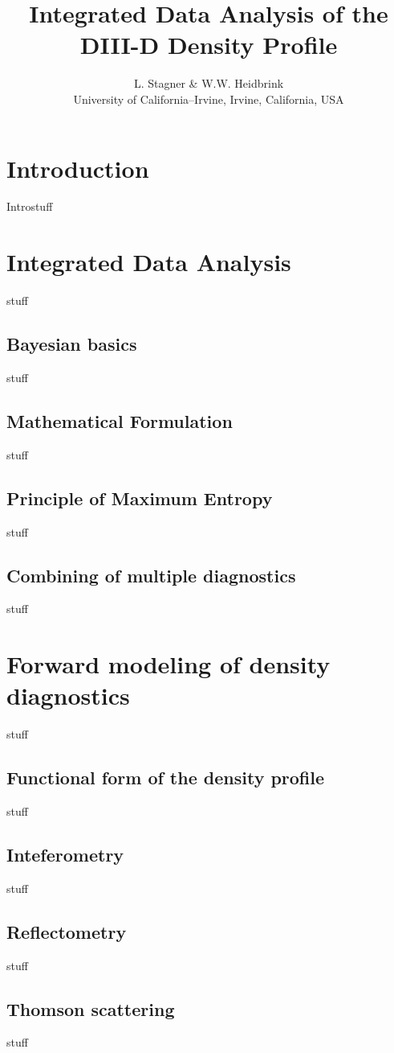 \documentclass	[12pt]{article}
\begin{document}
\title{\bf{Integrated Data Analysis of the DIII-D Density Profile}}
\author{L. Stagner \& W.W. Heidbrink \\ University of California--Irvine, Irvine, California, USA}
\date{}
\maketitle
\begin{abstract}
\end{abstract}
\section{Introduction}
Introstuff \cite{sivia2006data}
\section{Integrated Data Analysis}
stuff
\subsection{Bayesian basics}
stuff
\subsection{Mathematical Formulation}
stuff
\subsection{Principle of Maximum Entropy}
stuff
\subsection{Combining of multiple diagnostics}
stuff
\section{Forward modeling of density diagnostics}
stuff
\subsection{Functional form of the density profile}
stuff
\subsection{Inteferometry}
stuff
\subsection{Reflectometry}
stuff
\subsection{Thomson scattering}
stuff
\end{document}
